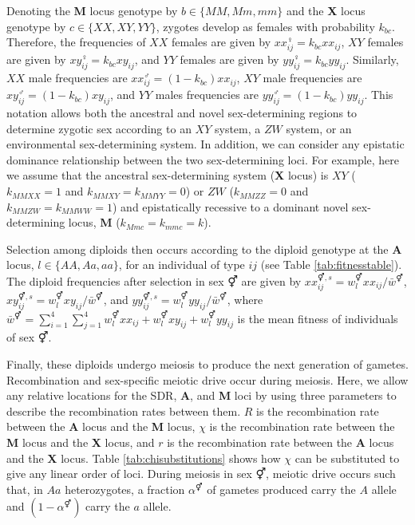 \documentclass[12pt]{article}
\begin{document}
Denoting the \textbf{M} locus genotype by $b \in \{MM, Mm, mm\}$ and the \textbf{X} locus genotype by $c \in \{XX, XY, YY\}$, zygotes develop as females with probability $k_{bc}$. 
Therefore, the frequencies of $XX$ females are given by $xx_{ij}^{\female}=k_{bc}xx_{ij}$, $XY$ females are given by $xy_{ij}^{\female}=k_{bc}xy_{ij}$, and $YY$ females are given by $yy_{ij}^{\female}=k_{bc}yy_{ij}$. 
Similarly, $XX$ male frequencies are $xx_{ij}^{\male}=(1-k_{bc})xx_{ij}$, $XY$ male frequencies are $xy_{ij}^{\male}=(1-k_{bc})xy_{ij}$, and $YY$ males frequencies are $yy_{ij}^{\male}=(1-k_{bc})yy_{ij}$.
This notation allows both the ancestral and novel sex-determining regions to determine zygotic sex according to an $XY$ system, a $ZW$ system, or an environmental sex-determining system. 
In addition, we can consider any epistatic dominance relationship between the two sex-determining loci. 
For example, here we assume that the ancestral sex-determining system (\textbf{X} locus) is $XY$ ($k_{MMXX}=1$ and $k_{MMXY}=k_{MMYY}=0$) or $ZW$ ($k_{MMZZ}=0$ and $k_{MMZW}=k_{MMWW}=1$) and epistatically recessive to a dominant novel sex-determining locus, \textbf{M} ($k_{Mmc}=k_{mmc}=k$). 


Selection among diploids then occurs according to the diploid genotype at the \textbf{A} locus, $l \in \{AA, Aa, aa\}$, for an individual of type $ij$ (see Table \ref{tab:fitnesstable}). 
The diploid frequencies after selection in sex $\Hermaphrodite$ are given by $xx_{ij}^{\Hermaphrodite,s}=w_{l}^{\Hermaphrodite} xx_{ij}/\bar{w}^{\Hermaphrodite}$, $xy_{ij}^{\Hermaphrodite,s}=w_{l}^{\Hermaphrodite} xy_{ij}/\bar{w}^{\Hermaphrodite}$, and $yy_{ij}^{\Hermaphrodite,s}=w_{l}^{\Hermaphrodite} yy_{ij}/\bar{w}^{\Hermaphrodite}$, where $\bar{w}^{\Hermaphrodite}= \sum_{i=1}^{4}\sum_{j=1}^{4}w_{l}^{\Hermaphrodite}xx_{ij}+w_{l}^{\Hermaphrodite}xy_{ij}+w_{l}^{\Hermaphrodite}yy_{ij}$ is the mean fitness of individuals of sex $\Hermaphrodite$. 

Finally, these diploids undergo meiosis to produce the next generation of gametes. 
Recombination and sex-specific meiotic drive occur during meiosis.
Here, we allow any relative locations for the SDR, \textbf{A}, and \textbf{M} loci by using three parameters to describe the recombination rates between them. 
$R$ is the recombination rate between the \textbf{A} locus and the \textbf{M} locus, $\chi$ is the recombination rate between the \textbf{M} locus and the \textbf{X} locus, and $r$ is the recombination rate between the \textbf{A} locus and the \textbf{X} locus. 
Table \ref{tab:chisubstitutions} shows how $\chi$ can be substituted to give any linear order of loci.
During meiosis in sex $\Hermaphrodite$, meiotic drive occurs such that, in $Aa$ heterozygotes, a fraction $\alpha^{\Hermaphrodite}$ of gametes produced carry the $A$ allele and $(1-\alpha^\Hermaphrodite)$ carry the $a$ allele. 
\end{document}

